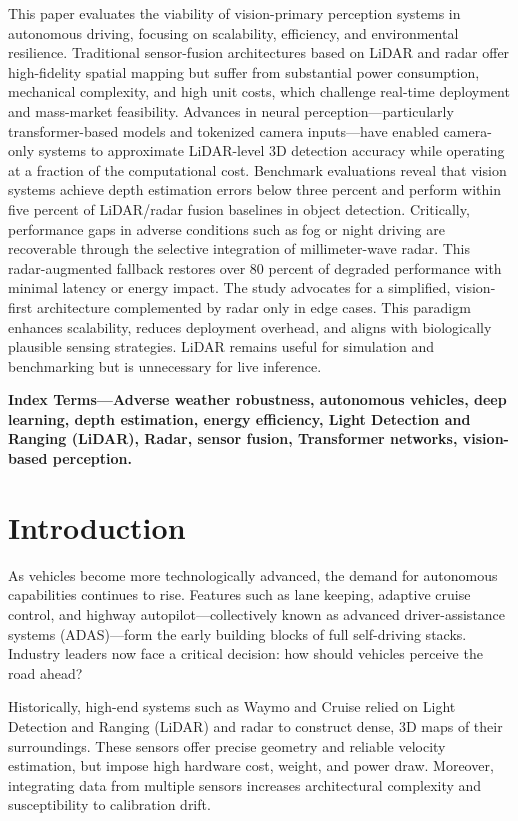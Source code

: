 \documentclass[12pt]{article}
\begin{document}
This paper evaluates the viability of vision-primary perception systems in autonomous driving, focusing on scalability, efficiency, and environmental resilience. Traditional sensor-fusion architectures based on LiDAR and radar offer high-fidelity spatial mapping but suffer from substantial power consumption, mechanical complexity, and high unit costs, which challenge real-time deployment and mass-market feasibility. Advances in neural perception—particularly transformer-based models and tokenized camera inputs—have enabled camera-only systems to approximate LiDAR-level 3D detection accuracy while operating at a fraction of the computational cost. Benchmark evaluations reveal that vision systems achieve depth estimation errors below three percent and perform within five percent of LiDAR/radar fusion baselines in object detection. Critically, performance gaps in adverse conditions such as fog or night driving are recoverable through the selective integration of millimeter-wave radar. This radar-augmented fallback restores over 80 percent of degraded performance with minimal latency or energy impact. The study advocates for a simplified, vision-first architecture complemented by radar only in edge cases. This paradigm enhances scalability, reduces deployment overhead, and aligns with biologically plausible sensing strategies. LiDAR remains useful for simulation and benchmarking but is unnecessary for live inference.

\textbf{Index Terms—Adverse weather robustness, autonomous vehicles, deep
	learning, depth estimation, energy efficiency, Light Detection and Ranging
(LiDAR), Radar, sensor fusion, Transformer networks, vision-based perception.}
\newpage

\section{Introduction}

As vehicles become more technologically advanced, the demand for autonomous capabilities continues to rise. Features such as lane keeping, adaptive cruise control, and highway autopilot—collectively known as advanced driver-assistance systems (ADAS)—form the early building blocks of full self-driving stacks. Industry leaders now face a critical decision: how should vehicles perceive the road ahead?

Historically, high-end systems such as Waymo and Cruise relied on Light Detection and Ranging (LiDAR) and radar to construct dense, 3D maps of their surroundings. These sensors offer precise geometry and reliable velocity estimation, but impose high hardware cost, weight, and power draw. Moreover, integrating data from multiple sensors increases architectural complexity and susceptibility to calibration drift.
\end{document}
